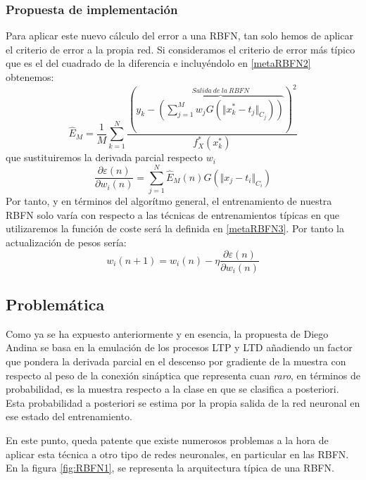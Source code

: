 \documentclass[10pt,a4paper]{report}
\begin{document}
\subsubsection{Propuesta de implementación}
Para aplicar este nuevo cálculo del error a una RBFN, tan solo hemos de aplicar el criterio de error a la propia red. Si consideramos el criterio de error más típico que es el del cuadrado de la diferencia e incluyéndolo en \ref{metaRBFN2} obtenemos:
\begin{equation}
	\label{metaRBFN3}
	\widehat{E}_M=\dfrac{1}{M}\sum^N_{k=1}\dfrac{(y_k - \overbrace{\left(\sum^M_{j=1}{w_j G(\Vert x^*_k - t_j \Vert_{C_j})}\right)}^{Salida\ de\ la\ RBFN})^2}{f^*_X(x^*_k)}
\end{equation}
que sustituiremos la derivada parcial respecto $w_i$
\begin{equation}
	\dfrac{\partial\varepsilon(n)}{\partial w_i(n)} = \sum^N_{j=1}{\widehat{E}_M(n) G(\Vert x_j - t_i \Vert_{C_i})}
\end{equation}
Por tanto, y en términos del algorítmo general, el entrenamiento de nuestra RBFN solo varía con respecto a las técnicas de entrenamientos típicas en que utilizaremos la función de coste será la definida en \ref{metaRBFN3}. Por tanto la actualización de pesos sería:
\begin{equation}
	w_i(n+1)=w_i(n) - \eta \dfrac{\partial\varepsilon(n)}{\partial w_i(n)}
\end{equation}

\subsection{Problemática} 
Como ya se ha expuesto anteriormente y en esencia, la propuesta de Diego Andina se basa en la emulación de los procesos LTP y LTD añadiendo un factor que pondera la derivada parcial en el descenso por gradiente de la muestra con respecto al peso de la conexión sináptica que representa cuan \textit{raro}, en términos de probabilidad, es la muestra respecto a la clase en que se clasifica a posteriori. Esta probabilidad a posteriori se estima por la propia salida de la red neuronal en ese estado del entrenamiento. 

En este punto, queda patente que existe numerosos problemas a la hora de aplicar esta técnica a otro tipo de redes neuronales, en particular en las RBFN. En la figura \ref{fig:RBFN1}, se representa la arquitectura típica de una RBFN.
\end{document}
